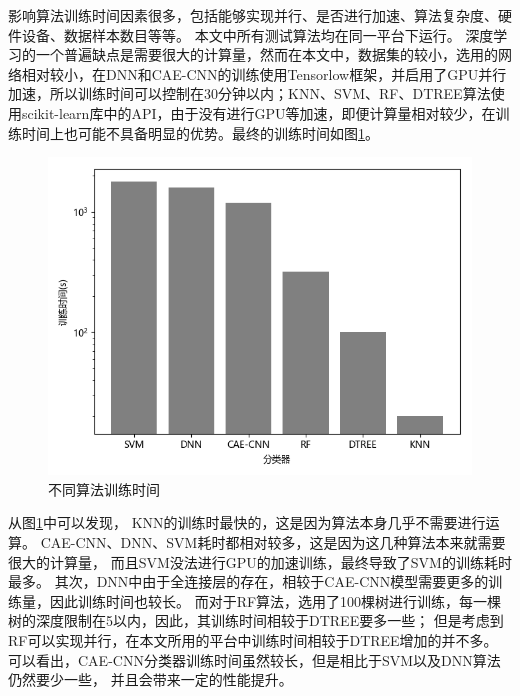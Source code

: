 影响算法训练时间因素很多，包括能够实现并行、是否进行加速、算法复杂度、硬件设备、数据样本数目等等。
本文中所有测试算法均在同一平台下运行。
深度学习的一个普遍缺点是需要很大的计算量，然而在本文中，数据集的较小，选用的网络相对较小，在DNN和CAE-CNN的训练使用Tensorlow框架，并启用了GPU并行加速，所以训练时间可以控制在30分钟以内；KNN、SVM、RF、DTREE算法使用scikit-learn库中的API，由于没有进行GPU等加速，即便计算量相对较少，在训练时间上也可能不具备明显的优势。最终的训练时间如图\ref{sec:fig_3_12}。\par
\begin{figure}[!h]
	\centering
	\includegraphics[scale=0.65]{figures/chapter_3/fig_3_12}
	\caption{不同算法训练时间}	\label{sec:fig_3_12}
\end{figure}
从图\ref{sec:fig_3_12}中可以发现，
KNN的训练时最快的，这是因为算法本身几乎不需要进行运算。
CAE-CNN、DNN、SVM耗时都相对较多，这是因为这几种算法本来就需要很大的计算量，
而且SVM没法进行GPU的加速训练，最终导致了SVM的训练耗时最多。
其次，DNN中由于全连接层的存在，相较于CAE-CNN模型需要更多的训练量，因此训练时间也较长。
而对于RF算法，选用了100棵树进行训练，每一棵树的深度限制在5以内，因此，其训练时间相较于DTREE要多一些；
但是考虑到RF可以实现并行，在本文所用的平台中训练时间相较于DTREE增加的并不多。
可以看出，CAE-CNN分类器训练时间虽然较长，但是相比于SVM以及DNN算法仍然要少一些，
并且会带来一定的性能提升。\par

